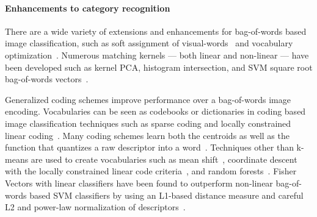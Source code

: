         \paragraph{Enhancements to category recognition}
        There are a wide variety of extensions and enhancements for
          bag-of-words based image classification, such as soft
          assignment of visual-words~\cite{liu_defense_2011} and
          vocabulary optimization~\cite{wang_localityconstrained_2010}.
        Numerous matching kernels --- both linear and non-linear ---
          have been developed such as kernel PCA, histogram intersection,
          and SVM square root bag-of-words
          vectors~\cite{vedaldi_multiple_2009, maji_classification_2008,
          perronnin_largescale_2010}.

        Generalized coding schemes improve performance over a
          bag-of-words image encoding.
        Vocabularies can be seen as codebooks or dictionaries in coding
          based image classification techniques such as sparse coding and
          locally constrained linear coding~\cite{jurie_creating_2005,
          yang_linear_2009, yang_supervised_2010, yang_efficient_2010,
          wang_localityconstrained_2010}.
        Many coding schemes learn both the centroids as well as the
          function that quantizes a raw descriptor into a
          word~\cite{jurie_creating_2005, yang_linear_2009,
          yang_supervised_2010, yang_efficient_2010,
          wang_localityconstrained_2010, vedaldi_multiple_2009}.
        Techniques other than k-means are used to create vocabularies
          such as mean shift~\cite{jurie_creating_2005}, coordinate
          descent with the locally constrained linear code
          criteria~\cite{wang_localityconstrained_2010}, and random
          forests~\cite{perronnin_fisher_2007}.
        Fisher Vectors with linear classifiers have been found to
          outperform non-linear bag-of-words based SVM classifiers by
          using an L1-based distance measure and careful L2 and power-law
          normalization of descriptors~\cite{perronnin_improving_2010,
          perronnin_largescale_2010-1}.



